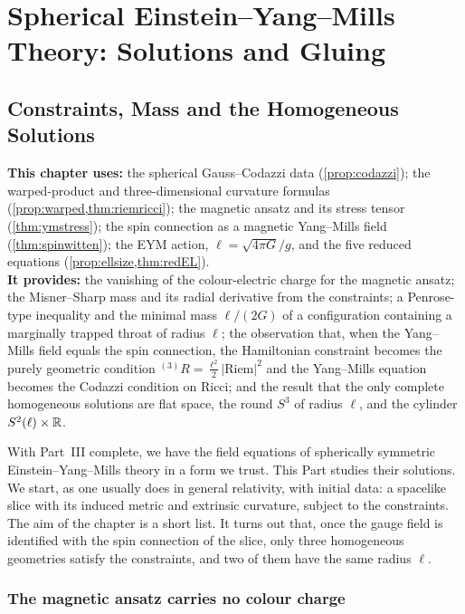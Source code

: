 \part{Spherical Einstein--Yang--Mills Theory: Solutions and Gluing}

\chapter{Constraints, Mass and the Homogeneous Solutions}
\label{ch:constraints}

\begin{usesbox}
\textbf{This chapter uses:} the spherical Gauss--Codazzi data (\cref{prop:codazzi}); the warped-product and three-dimensional curvature formulas (\cref{prop:warped,thm:riemricci}); the magnetic ansatz and its stress tensor (\cref{thm:ymstress}); the spin connection as a magnetic Yang--Mills field (\cref{thm:spinwitten}); the EYM action, $\ell=\sqrt{4\pi G}/g$, and the five reduced equations (\cref{prop:ellsize,thm:redEL}).\\
\textbf{It provides:} the vanishing of the colour-electric charge for the magnetic ansatz; the Misner--Sharp mass and its radial derivative from the constraints; a Penrose-type inequality and the minimal mass $\ell/(2G)$ of a configuration containing a marginally trapped throat of radius $\ell$; the observation that, when the Yang--Mills field equals the spin connection, the Hamiltonian constraint becomes the purely geometric condition ${}^{(3)}R=\frac{\ell^2}2|\mathrm{Riem}|^2$ and the Yang--Mills equation becomes the Codazzi condition on Ricci; and the result that the only complete homogeneous solutions are flat space, the round $S^3$ of radius $\ell$, and the cylinder $S^2(\ell)\times\mathbb{R}$.
\end{usesbox}

With Part~III complete, we have the field equations of spherically symmetric Einstein--Yang--Mills theory in a form we trust. This Part studies their solutions. We start, as one usually does in general relativity, with initial data: a spacelike slice with its induced metric and extrinsic curvature, subject to the constraints. The aim of the chapter is a short list. It turns out that, once the gauge field is identified with the spin connection of the slice, only three homogeneous geometries satisfy the constraints, and two of them have the same radius $\ell$.

\section{The magnetic ansatz carries no colour charge}

